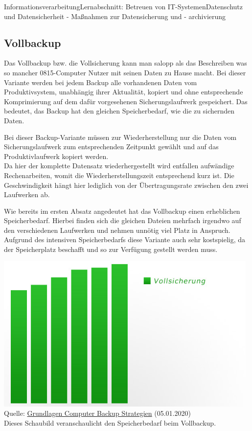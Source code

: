 \documentclass[11pt,oneside,openany,headings=optiontotoc,11pt,numbers=noenddot]{article}
\begin{document}
\begin{worksheet}{Informationsverarbeitung}{Lernabschnitt: Betreuen von IT-Systemen}{Datenschutz und Datensicherheit - Maßnahmen zur Datensicherung und - archivierung}
		\subsection{Vollbackup}
		Das Vollbackup bzw. die Vollsicherung kann man salopp als das Beschreiben was so mancher 0815-Computer Nutzer mit seinen Daten zu Hause macht. Bei dieser Variante werden bei jedem Backup alle vorhandenen Daten vom Produktivsystem, unabhängig ihrer Aktualität, kopiert und ohne entsprechende Komprimierung auf dem dafür vorgesehenen Sicherungslaufwerk gespeichert. Das bedeutet, das Backup hat den gleichen Speicherbedarf, wie die zu sichernden Daten.\\
		\par\noindent
		Bei dieser Backup-Variante müssen zur Wiederherstellung nur die Daten vom Sicherungslaufwerk zum entsprechenden Zeitpunkt gewählt und auf das Produktivlaufwerk \grqq{}kopiert\grqq{} werden.\\
		Da hier der komplette Datensatz wiederhergestellt wird entfallen aufwändige Rechenarbeiten, womit die Wiederherstellungszeit entsprechend kurz ist. Die Geschwindigkeit hängt hier lediglich von der Übertragungsrate zwischen den zwei Laufwerken ab.\\
		\par\noindent
		Wie bereits im ersten Absatz angedeutet hat das Vollbackup einen erheblichen Speicherbedarf. Hierbei finden sich die gleichen Dateien mehrfach \grq{}irgendwo\grq{} auf den verschiedenen Laufwerken und nehmen unnötig viel Platz in Anspruch.\\
		\newpage
		\noindent
		Aufgrund des intensiven Speicherbedarfs diese Variante auch sehr kostspielig, da der Speicherplatz beschafft und so zur Verfügung gestellt werden muss.\\
		\par\noindent
		\includegraphics[width=0.98\textwidth]{../99_Bilder/01_voll.jpg}\\
		\tiny{Quelle: \href{https://www.grundlagen-computer.de/backup/backup-strategien-inkrementell-differentiell-und-vollbackup}{Grundlagen Computer Backup Strategien} (05.01.2020)}\\
		\footnotesize{Dieses Schaubild veranschaulicht den Speicherbedarf beim Vollbackup.}\normalsize

\end{worksheet}
\end{document}
